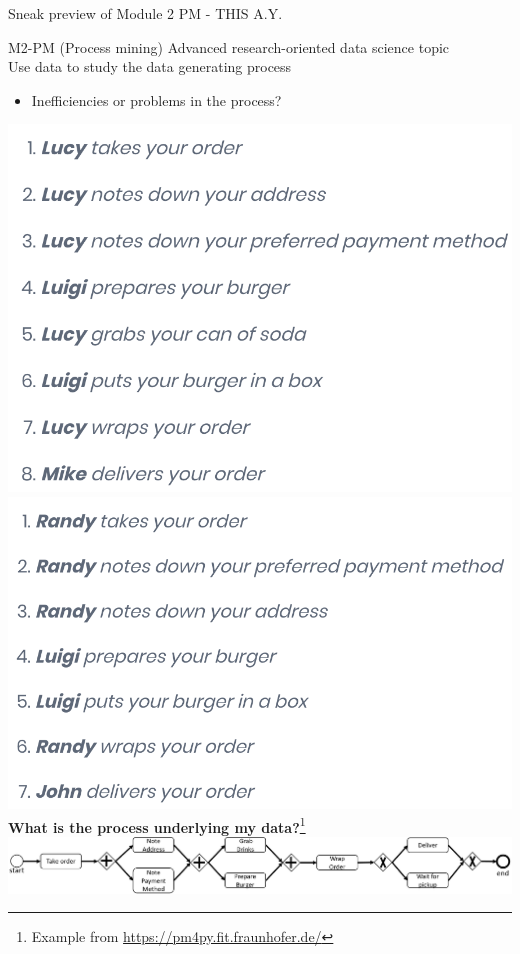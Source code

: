 \documentclass{beamer}%
\begin{document}
\begin{frame}{Sneak preview of Module 2  PM - THIS A.Y.}
	\centering 
		\begin{block}{M2-PM (Process mining)}
		Advanced research-oriented data science topic\\
		Use data to study the data generating process
			\begin{itemize}
			\item Inefficiencies or problems in the process?
		\end{itemize}
	\end{block}
	

	
	\includegraphics[width=0.36\linewidth]{figures/lucy.png}
	\includegraphics[width=0.36\linewidth]{figures/randy.png}\\
		\textbf{What is the process underlying my data?}\footnote{Example from \url{https://pm4py.fit.fraunhofer.de/}}\\
	\includegraphics[width=0.9\linewidth]{figures/simple_sample_model.png}
	
\end{frame}
\end{document}
